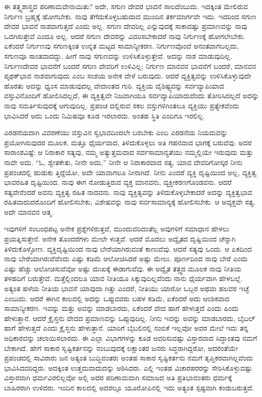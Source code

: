 ಈ ತತ್ತ್ವಶಾಸ್ತ್ರದ ಪರಿಣಾಮವೇನಾಯಿತು? ಅದೇ, ಸಗುಣ ದೇವರ ಭಾವನೆ ಸಾಲದೆಂಬುದು. ಇದಕ್ಕಿಂತ ಮೇಲಿರುವ ನಿರ್ಗುಣ ಬ್ರಹ್ಮಕ್ಕೆ ಹೋಗಬೇಕು. ನಾವು ತೆಗೆದುಕೊಳ್ಳಬಹುದಾದ ಮುಂದಿನ ತರ್ಕಮಾರ್ಗವೇ ಇದು. ಇದರಿಂದ ಸಗುಣ ದೇವರ ಭಾವನೆ ನಾಶವಾಗುತ್ತದೆ ಎಂದು ಅಲ್ಲ. ಸಗುಣ ದೇವರಿಲ್ಲ ಎನ್ನುವುದಕ್ಕೆ ಸಾಕಾದಷ್ಟು ಪ್ರಮಾಣವನ್ನು ನಾವು ಒದಗಿಸುತ್ತೇವೆ ಎಂದೂ ಅಲ್ಲ. ಆದರೆ ಸಗುಣ ದೇವರನ್ನು ವಿವರಿಸಬೇಕಾದರೆ ನಾವು ನಿರ್ಗುಣಕ್ಕೆ ಹೋಗಲೇಬೇಕು. ಏಕೆಂದರೆ ನಿರ್ಗುಣವು ಸಗುಣಕ್ಕಿಂತ ಉನ್ನತ ಮಟ್ಟದ ಸಾಮಾನ್ಯೀಕರಣ. ನಿರ್ಗುಣವೊಂದೆ ಅನಂತವಾಗಬಲ್ಲದು, ಸಗುಣವೂ ಸಾಂತವಾದದ್ದು. ಹೀಗೆ ನಾವು ಸಗುಣವನ್ನು ಉಳಿಸಿಕೊಳ್ಳುತ್ತೇವೆ. ಅದನ್ನು ನಾಶ ಮಾಡುವುದಿಲ್ಲ. ನಿರ್ಗುಣದೇವರ ಭಾವನೆಗೆ ಬಂದರೆ ಸಗುಣ ದೇವರಿಗೆ ಉಳಿವಿಲ್ಲ; ನಿರ್ಗುಣ ಮಾನವನ ಭಾವನೆಗೆ ಬಂದರೆ, ಮಾನವನ ಪೃಥಕ್​ಭಾವ ನಾಶವಾಗುವುದು ಎಂಬ ಸಂಶಯ ಅನೇಕ ವೇಳೆ ಬರುವುದು. ಆದರೆ ವ್ಯಕ್ತಿತ್ವವನ್ನು ಉಳಿಸಿಕೊಳ್ಳುವುದೇ ಹೊರತು ಅದನ್ನು ಧ್ವಂಸ ಮಾಡುವುದಲ್ಲ ವೇದಾಂತದ ಗುರಿ. ವ್ಯಕ್ತಿಯ ವೈಶಿಷ್ಟ್ಯವನ್ನು ಸರ್ವವ್ಯಾಪಿಯಾದ ವಸ್ತುವಿನೊಂದಿಗೆ ಹೋಲಿಸಿದಲ್ಲದೆ, ಈ ವ್ಯಕ್ತಿತ್ವವೇ ನಿಜವಾಗಿಯೂ ಸರ್ವವ್ಯಾಪಿಯಾದುದೆಂದು ತೋರಿಸಿದಲ್ಲದೆ ಅದನ್ನು ನಾವು ಸಮರ್ತಿಸುವುದಕ್ಕೆ ಆಗುವುದಿಲ್ಲ. ಪ್ರಪಂಚ ದಲ್ಲಿರುವ ಸಕಲ ವಸ್ತುಗಳಿಗಿಂತಲೂ ವ್ಯಕ್ತಿಯು ಪ್ರತ್ಯೇಕವೆಂದು ಭಾವಿಸಿದರೆ ಅದು ಒಂದು ನಿಮಿಷವೂ ಕೂಡ ಇರಲಾರದು. ಅಂತಹ ಸ್ಥಿತಿ ಎಂದಿಗೂ ಇರಲಿಲ್ಲ.

ಎರಡನೆಯದಾಗಿ ವಿವರಣೆಯು ವಸ್ತುವಿನ ಸ್ವಭಾವದಿಂದಲೇ ಬರಬೇಕು ಎಂಬ ಎರಡನೆಯ ನಿಯಮವನ್ನು ಪ್ರಯೋಗಿಸುವುದರ ಮೂಲಕ, ಮತ್ತೂ ಧೈರ್ಯವಾದ, ತಿಳಿದುಕೊಳ್ಳಲು ಅತಿ ಗಹನವಾದ ಭಾಗಕ್ಕೆ ಬರುವೆವು. ಅದರ ಸಾರಾಂಶವಿಷ್ಟೆ: ಆ ನಿರಾಕಾರ ಸತ್ಯವು, ನಮ್ಮ ಅತ್ಯುತ್ತಮವಾದ ಸರ್ವಸಾಮಾನ್ಯತೆಯು ನಮ್ಮಲ್ಲಿಯೇ ಇರುವುದು ಮತ್ತು ನಾವೇ ಅದು. “ಓ, ಶ್ವೇತಕೇತು, ನೀನೇ ಅದು,” ನೀನೇ ಆ ನಿರಾಕಾರವಾದ ಸತ್ಯ. ಯಾವ ದೇವರಿಗೋಸ್ಕರ ನೀನು ಪ್ರಪಂಚದಲ್ಲಿ ಹುಡುಕು ತ್ತಿದ್ದೆಯೋ, ಅದೇ ಯಾವಾಗಲೂ ನೀನಾಗಿದೆ. ನೀನು ಎಂದರೆ ವ್ಯಕ್ತಿ ದೃಷ್ಟಿಯಿಂದ ಅಲ್ಲ, ವ್ಯಕ್ತಿತ್ವ ಭಾವರಹಿತ ದೃಷ್ಟಿಯಿಂದ. ನಾವು ಈಗ ನೋಡುತ್ತಿರುವ ವ್ಯಕ್ತ ಮಾನವನು, ವ್ಯಕ್ತೀಕರಣಗೊಂಡವನು. ಆದರೆ ಸತ್ಯವೇನೆಂದರೆ ಅವನು ವ್ಯಕ್ತಿತ್ವ ರಹಿತ ನಾದವನು. ನಾವು ವ್ಯಕ್ತಿತ್ವವನ್ನು ತಿಳಿದುಕೊಳ್ಳಬೇಕಾದರೆ ಅದನ್ನು ವ್ಯಕ್ತಿತ್ವಭಾವ ರಹಿತವಾದುದರೊಂದಿಗೆ ಹೋಲಿಸಬೇಕು, ವಿಶೇಷವನ್ನು ನಾವು ಸರ್ವಸಾಮಾನ್ಯಕ್ಕೆ ಹೋಲಿಸಬೇಕು. ಆ ಅವ್ಯಕ್ತವೇ ಸತ್ಯ. ಅದೇ ಮಾನವನ ಆತ್ಮ.

ಇವುಗಳಿಗೆ ಸಂಬಂಧಪಟ್ಟ ಅನೇಕ ಪ್ರಶ್ನೆಗಳಿರುತ್ತವೆ, ಮುಂದುವರಿದಂತೆಲ್ಲ ಅವುಗಳಿಗೆ ಸಮಾಧಾನ ಹೇಳಲು ಪ್ರಯತ್ನಿಸುತ್ತೇನೆ. ಅನೇಕ ತೊಂದರೆಗಳು ಮೇಲೇ ಳುತ್ತವೆ. ಆದರೆ ಮೊದಲು ಅದ್ವೈತದ ದೃಷ್ಟಿಯಿಂದ ಚೆನ್ನಾಗಿ ತಿಳಿದುಕೊಳ್ಳೋಣ. ವ್ಯಕ್ತಿದೃಷ್ಟಿಯಿಂದ ನಾವು ಬೇರೆಯಾಗಿರುವಂತೆ ಕಾಣುವೆವು. ಆದರೆ ಸತ್ಯವು ಒಂದು. ಆ ಏಕದಿಂದ ನಾವು ಬೇರೆಯಾಗಿರುವೆವೆಂದು ಎಷ್ಟು ಕಡಿಮೆ ಆಲೋಚಿಸಿದರೆ ಅಷ್ಟು ಮೇಲು. ಪೂರ್ಣದಿಂದ ನಾವು ಬೇರೆ ಎಂದು ಎಷ್ಟು ಹೆಚ್ಚು ಆಲೋಚಿಸುವೆವೋ ಅಷ್ಟು ದುಃಖಕ್ಕೆ ಈಡಾಗುವೆವು. ಈ ಅದ್ವೈತ ತತ್ತ್ವದ ಮೂಲಕ ನಾವು ನೀತಿಯ ತಳಹದಿಗೆ ಬರುತ್ತೇವೆ. ಮತ್ತೆಲ್ಲಿಂದಲೂ ಯಾವ ನೀತಿಯೂ ಸಿಕ್ಕುವುದಿಲ್ಲವೆಂದು ನಾನು ಧೈರ್ಯವಾಗಿ ಹೇಳಬಲ್ಲೆ. ಅತ್ಯಂತ ಹಳೆಯ ನೀತಿಯ ಭಾವನೆ ಯಾವುದಾ ಗಿತ್ತು ಎಂದರೆ, ನೀತಿಯು ಯಾರೋ ಒಬ್ಬರ ಅಥವಾ ಹಲವರ ಇಚ್ಛೆ ಎಂಬುದು. ಆದರೆ ಈಗಿನ ಕಾಲದಲ್ಲಿ ಅದನ್ನು ಒಪ್ಪುವವರು ಬಹಳ ಕಡಿಮೆ, ಏಕೆಂದರೆ ಅದು ಆಂಶಿಕವಾದ ಸಾಮಾನ್ಯೀಕರಣ. ಇವನ್ನು ಮತ್ತು ಅವನ್ನು ಮಾಡಬಾರದು, ಏಕೆಂದರೆ ವೇದ ಹಾಗೆ ಹೇಳುತ್ತದೆ ಎಂದು ಹಿಂದು ಹೇಳುತ್ತಾನೆ. ಆದರೆ ಕ್ರೈಸ್ತನು ವೇದದ ಪ್ರಮಾಣವನ್ನು ಒಪ್ಪುವುದಿಲ್ಲ. ನೀನು ಇವನ್ನು ಅವನ್ನು ಮಾಡಬಾರದು, ಬೈಬಲ್​ ಹಾಗೆ ಹೇಳುತ್ತದೆ ಎಂದು ಕ್ರೈಸ್ತನು ಹೇಳುತ್ತಾನೆ. ಯಾರಿಗೆ ಬೈಬಲಿನಲ್ಲಿ ನಂಬಿಕೆ ಇಲ್ಲವೋ ಅವರ ಮೇಲೆ ಇದು ತನ್ನ ಅಧಿಕಾರವನ್ನು ಚಲಾಯಿಸಲಾರದು. ಈ ಎಲ್ಲಾ ವಿಭಾಗಗಳನ್ನು ಕೂಡ ಆವರಿಸುವಷ್ಟು ವಿಸ್ತಾರವಾದ ಸಿದ್ಧಾಂತವು ನಮಗೆ ಬೇಕಾಗಿದೆ. ಹೇಗೆ ಸಾಕಾರ ಸೃಷ್ಟಿಕರ್ತನನ್ನು ನಂಬುವುದಕ್ಕೆ ಲಕ್ಷಾಂತರ ಜನರು ಸಿದ್ಧರಾಗಿದ್ದರೋ, ಅದರಂತೆಯೇ ಪ್ರಪಂಚದಲ್ಲಿ ಸಾವಿರಾರು ಜನ ಅತ್ಯಂತ ಬುದ್ಧಿವಂತರು ಅಂತಹ ಸಾಕಾರ ಸೃಷ್ಟಿಕರ್ತನು ನಮಗೆ ತೃಪ್ತಿಕರವಾಗಿಲ್ಲವೆಂದು ಭಾವಿಸಿದವರಿದ್ದರು. ಅದಕ್ಕಿಂತ ಉತ್ತಮವಾದುದನ್ನು ಆಶಿಸಿದರು. ಎಲ್ಲಿ ಇಂತಹ ವಿಚಾರಪರರನ್ನು ಸೇರಿಸಿಕೊಳ್ಳುವಷ್ಟು ವಿಸ್ತಾರವಾಗಿ ಧರ್ಮವಿರಲಿಲ್ಲವೋ ಅಲ್ಲಿ ಅದರ ಪರಿಣಾಮವಾಗಿ ಸಮಾಜದ ಅತಿ ಪ್ರತಿಭಾವಂತರು ಧರ್ಮಕ್ಕೆ ಬಾಹಿರರಾಗಿ ಉಳಿದರು. ಇಂದಿನ ಕಾಲದಲ್ಲಿ ಅದರಲ್ಲೂ ಯೂರೋಪಿನಲ್ಲಿ ಇದು ಅತ್ಯಂತ ಸ್ಪಷ್ಟವಾಗಿ ಕಂಡುಬರುತ್ತದೆ.

